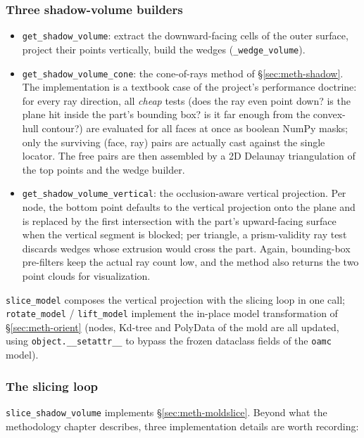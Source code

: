 \subsubsection{Three shadow-volume builders}

\begin{itemize}
  \item \texttt{get\_shadow\_volume}: extract the downward-facing cells
        of the outer surface, project their points vertically, build
        the wedges (\texttt{\_wedge\_volume}).
  \item \texttt{get\_shadow\_volume\_cone}: the cone-of-rays method of
        \S\ref{sec:meth-shadow}. The implementation is a textbook case
        of the project's performance doctrine: for every ray direction,
        all \emph{cheap} tests (does the ray even point down? is the
        plane hit inside the part's bounding box? is it far enough from
        the convex-hull contour?) are evaluated for all faces at once
        as boolean NumPy masks; only the surviving (face, ray) pairs
        are actually cast against the single locator. The free pairs
        are then assembled by a 2D Delaunay triangulation of the top
        points and the wedge builder.
  \item \texttt{get\_shadow\_volume\_vertical}: the occlusion-aware
        vertical projection. Per node, the bottom point defaults to the
        vertical projection onto the plane and is replaced by the
        first intersection with the part's upward-facing surface when
        the vertical segment is blocked; per triangle, a prism-validity
        ray test discards wedges whose extrusion would cross the part.
        Again, bounding-box pre-filters keep the actual ray count low,
        and the method also returns the two point clouds for
        visualization.
\end{itemize}

\texttt{slice\_model} composes the vertical projection with the
slicing loop in one call; \texttt{rotate\_model} /
\texttt{lift\_model} implement the in-place model transformation of
\S\ref{sec:meth-orient} (nodes, Kd-tree and PolyData of the mold are
all updated, using \texttt{object.\_\_setattr\_\_} to bypass the frozen
dataclass fields of the \texttt{oamc} model).

\subsubsection{The slicing loop}

\texttt{slice\_shadow\_volume} implements \S\ref{sec:meth-moldslice}.
Beyond what the methodology chapter describes, three implementation
details are worth recording:

